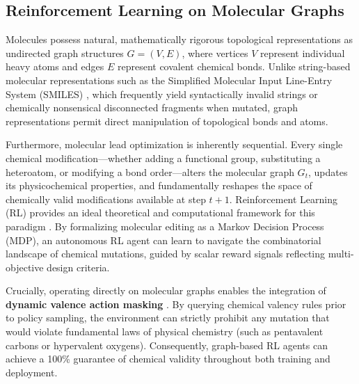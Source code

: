 \documentclass{ieeeaccess}
\begin{document}
\subsection{Reinforcement Learning on Molecular Graphs}
Molecules possess natural, mathematically rigorous topological representations as undirected graph structures $G=(V, E)$, where vertices $V$ represent individual heavy atoms and edges $E$ represent covalent chemical bonds. Unlike string-based molecular representations such as the Simplified Molecular Input Line-Entry System (SMILES) \cite{gomez2018}, which frequently yield syntactically invalid strings or chemically nonsensical disconnected fragments when mutated, graph representations permit direct manipulation of topological bonds and atoms.

Furthermore, molecular lead optimization is inherently sequential. Every single chemical modification---whether adding a functional group, substituting a heteroatom, or modifying a bond order---alters the molecular graph $G_t$, updates its physicochemical properties, and fundamentally reshapes the space of chemically valid modifications available at step $t+1$. Reinforcement Learning (RL) provides an ideal theoretical and computational framework for this paradigm \cite{you2018,zhou2019}. By formalizing molecular editing as a Markov Decision Process (MDP), an autonomous RL agent can learn to navigate the combinatorial landscape of chemical mutations, guided by scalar reward signals reflecting multi-objective design criteria.

Crucially, operating directly on molecular graphs enables the integration of \textbf{dynamic valence action masking} \cite{zhou2019}. By querying chemical valency rules prior to policy sampling, the environment can strictly prohibit any mutation that would violate fundamental laws of physical chemistry (such as pentavalent carbons or hypervalent oxygens). Consequently, graph-based RL agents can achieve a 100\% guarantee of chemical validity throughout both training and deployment.
\end{document}
